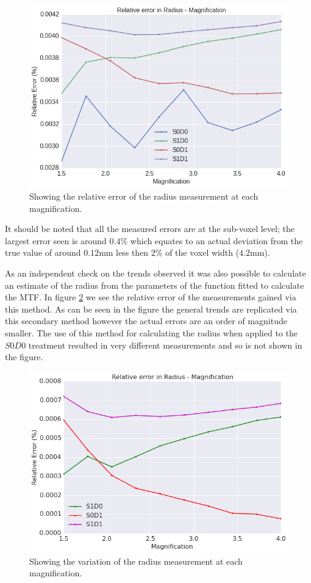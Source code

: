 \documentclass[
  twoside,
  11pt, a4paper,
  footinclude=true,
  headinclude=true,
  cleardoublepage=empty
]{scrbook}
\begin{document}
\begin{figure}[h!]
  \centering
    \includegraphics[width=\textwidth]{figures/output_8_0.png}
    \caption{Showing the relative error of the radius measurement at each magnification.}
        \label{relerrormeasuredradius}
\end{figure}

It should be noted that all the measured errors are at the sub-voxel level; the largest error seen is around $0.4\%$ which equates to an actual deviation from the true value of around $0.12$mm less then $2\%$ of the voxel width ($4.2$mm).

As an independent check on the trends observed it was also possible to calculate an estimate of the radius from the parameters of the function fitted to calculate the MTF. In figure \ref{mtfradius} we see the relative error of the measurements gained via this method. As can be seen in the figure the general trends  are replicated via this secondary method however the actual errors are an order of magnitude smaller. The use of this method for calculating the radius when applied to the $S0D0$ treatment resulted in very different measurements and so is not shown in the figure.

\begin{figure}[h!]
  \centering
    \includegraphics[width=\textwidth]{figures/output_35_0.png}
    \caption{Showing the variation of the radius measurement at each magnification.}
        \label{mtfradius}
\end{figure}
\end{document}
